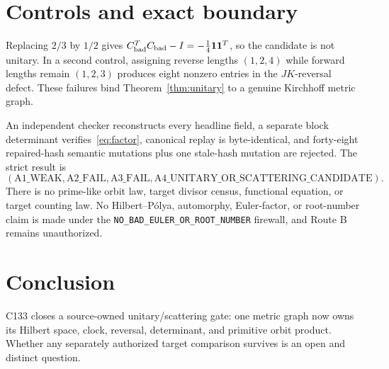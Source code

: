 \documentclass[11pt]{article}
\begin{document}
\section{Controls and exact boundary}

Replacing $2/3$ by $1/2$ gives
$C_{\rm bad}^{T}C_{\rm bad}-I=-\frac14\mathbf1\mathbf1^T$, so the candidate is
not unitary.  In a second control, assigning reverse lengths $(1,2,4)$ while
forward lengths remain $(1,2,3)$ produces eight nonzero entries in the
$JK$-reversal defect.  These failures bind Theorem~\ref{thm:unitary} to a
genuine Kirchhoff metric graph.

An independent checker reconstructs every headline field, a separate block
determinant verifies~\eqref{eq:factor}, canonical replay is byte-identical,
and forty-eight repaired-hash semantic mutations plus one stale-hash mutation
are rejected.  The strict result is
\[
 (\mathrm{A1\_WEAK},\mathrm{A2\_FAIL},\mathrm{A3\_FAIL},
  \mathrm{A4\_UNITARY\_OR\_SCATTERING\_CANDIDATE}).
\]
There is no prime-like orbit law, target divisor census, functional equation,
or target counting law.  No Hilbert--P\'olya, automorphy, Euler-factor, or
root-number claim is made under the
\texttt{NO\_BAD\_EULER\_OR\_ROOT\_NUMBER} firewall, and Route B remains
unauthorized.

\section{Conclusion}

C133 closes a source-owned unitary/scattering gate: one metric graph now owns
its Hilbert space, clock, reversal, determinant, and primitive orbit product.
Whether any separately authorized target comparison survives is an open and
distinct question.
\end{document}
